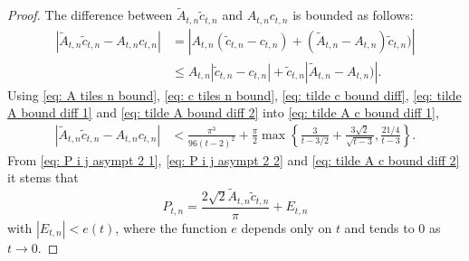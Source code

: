 \documentclass[12pt, a4paper]{article}
\newcommand{\tiles}{t} %
\begin{document}
\begin{proof}
The difference between $\tilde A_{\tiles,n} \tilde c_{\tiles,n}$ and $A_{\tiles,n} c_{\tiles,n}$ is bounded as follows:
\begin{equation}
\begin{split}
\label{eq: tilde A c bound diff 1}
|\tilde A_{\tiles,n} \tilde c_{\tiles,n} - A_{\tiles,n} c_{\tiles,n}|
&= |A_{\tiles,n} (\tilde c_{\tiles,n} - c_{\tiles,n}) + (\tilde A_{\tiles,n} - A_{\tiles,n}) \tilde c_{\tiles,n})| \\
&\leq A_{\tiles,n} \left|\tilde c_{\tiles,n} - c_{\tiles,n} \right| + \tilde c_{\tiles,n} |\tilde A_{\tiles,n} - A_{\tiles,n})|.
\end{split}
\end{equation}
Using \eqref{eq: A tiles n bound}, \eqref{eq: c tiles n bound}, \eqref{eq: tilde c bound diff}, \eqref{eq: tilde A bound diff 1} and \eqref{eq: tilde A bound diff 2} into \eqref{eq: tilde A c bound diff 1},
\begin{equation}
\begin{split}
\label{eq: tilde A c bound diff 2}
|\tilde A_{\tiles,n} \tilde c_{\tiles,n} - A_{\tiles,n} c_{\tiles,n}|
&< \frac {\pi^3} {96(\tiles-2)^2} + \frac{\pi}{2} \max\left\{
\frac 3 {\tiles-3/2} + \frac{3\sqrt{2}}{\sqrt{\tiles-3}}, \frac {21/4} {\tiles-3}
\right\}.
\end{split}
\end{equation}
From \eqref{eq: P i j asympt 2 1}, \eqref{eq: P i j asympt 2 2} and \eqref{eq: tilde A c bound diff 2} it stems that
\begin{equation}
\label{eq: P i j asympt 3 bis}
P_{\tiles,n} = \frac{2\sqrt{2} \tilde A_{\tiles,n} \tilde c_{\tiles,n}}{\pi} + E_{\tiles, n}
\end{equation}
with $|E_{\tiles, n}| < e(\tiles)$, where the function $e$ depends only on $\tiles$ and tends to $0$ as $\tiles \rightarrow 0$.


\end{proof}
\end{document}

